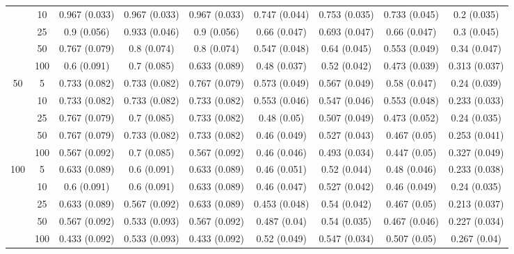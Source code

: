 \documentclass[10pt]{article}
\theoremstyle{definition}
\begin{document}
\begin{sidewaysfigure}
\begin{tabular}{cc|ccc|cccc}
    & 10  & 0.967 (0.033) & 0.967 (0.033) & 0.967 (0.033) & 0.747 (0.044) & 0.753 (0.035) & 0.733 (0.045) & 0.2 (0.035) \\ 
   & 25  & 0.9 (0.056) & 0.933 (0.046) & 0.9 (0.056) & 0.66 (0.047) & 0.693 (0.047) & 0.66 (0.047) & 0.3 (0.045) \\ 
    & 50  & 0.767 (0.079) & 0.8 (0.074) & 0.8 (0.074) & 0.547 (0.048) & 0.64 (0.045) & 0.553 (0.049) & 0.34 (0.047) \\ 
    & 100  & 0.6 (0.091) & 0.7 (0.085) & 0.633 (0.089) & 0.48 (0.037) & 0.52 (0.042) & 0.473 (0.039) & 0.313 (0.037) \\[.3cm] 
   \multirow{5}{*}{50}  & 5  & 0.733 (0.082) & 0.733 (0.082) & 0.767 (0.079) & 0.573 (0.049) & 0.567 (0.049) & 0.58 (0.047) & 0.24 (0.039) \\ 
    & 10  & 0.733 (0.082) & 0.733 (0.082) & 0.733 (0.082) & 0.553 (0.046) & 0.547 (0.046) & 0.553 (0.048) & 0.233 (0.033) \\ 
    & 25  & 0.767 (0.079) & 0.7 (0.085) & 0.733 (0.082) & 0.48 (0.05) & 0.507 (0.049) & 0.473 (0.052) & 0.24 (0.035) \\ 
    & 50  & 0.767 (0.079) & 0.733 (0.082) & 0.733 (0.082) & 0.46 (0.049) & 0.527 (0.043) & 0.467 (0.05) & 0.253 (0.041) \\ 
    & 100  & 0.567 (0.092) & 0.7 (0.085) & 0.567 (0.092) & 0.46 (0.046) & 0.493 (0.034) & 0.447 (0.05) & 0.327 (0.049) \\[.3cm] 
  \multirow{5}{*}{100}  & 5  & 0.633 (0.089) & 0.6 (0.091) & 0.633 (0.089) & 0.46 (0.051) & 0.52 (0.044) & 0.48 (0.046) & 0.233 (0.038) \\ 
    & 10  & 0.6 (0.091) & 0.6 (0.091) & 0.633 (0.089) & 0.46 (0.047) & 0.527 (0.042) & 0.46 (0.049) & 0.24 (0.035) \\ 
    & 25  & 0.633 (0.089) & 0.567 (0.092) & 0.633 (0.089) & 0.453 (0.048) & 0.54 (0.042) & 0.467 (0.05) & 0.213 (0.037) \\ 
    & 50  & 0.567 (0.092) & 0.533 (0.093) & 0.567 (0.092) & 0.487 (0.04) & 0.54 (0.035) & 0.467 (0.046) & 0.227 (0.034) \\ 
    & 100  & 0.433 (0.092) & 0.533 (0.093) & 0.433 (0.092) & 0.52 (0.049) & 0.547 (0.034) & 0.507 (0.05) & 0.267 (0.04) \\
\end{tabular}
\end{sidewaysfigure}
\end{document}
